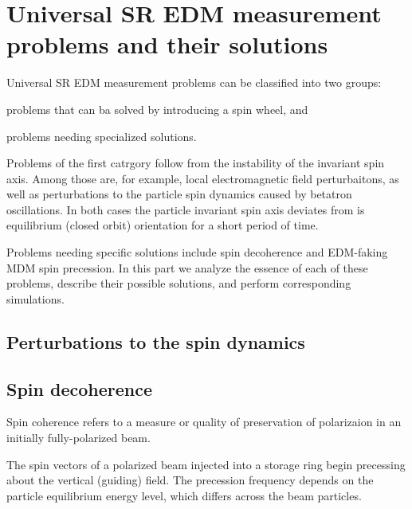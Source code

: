 

\chapter{Universal SR EDM measurement problems and their solutions} \label{chpt3:top-level}
 
Universal SR EDM measurement problems can be classified into two groups:
\begin{enumerate*}
	\item problems that can ba solved by introducing a spin wheel, and
	\item problems needing specialized solutions.
\end{enumerate*}

Problems of the first catrgory follow from the instability of the invariant spin axis. Among those are,
for example, local electromagnetic field perturbaitons, as well as perturbations to the particle
spin dynamics caused by betatron oscillations. In both cases the particle invariant spin axis deviates from
is equilibrium (closed orbit) orientation for a short period of time.

Problems needing specific solutions include spin decoherence and EDM-faking MDM spin precession. In this part we
analyze the essence of each of these problems, describe their possible solutions, and perform corresponding
simulations.
  
\section{Perturbations to the spin dynamics}\label{chpt3:smp}


\section{Spin decoherence}\label{chpt3:decoherence}
Spin coherence refers to a measure or quality of preservation of polarizaion
in an initially fully-polarized beam.~\cite[стр.~205]{Eremey:Thesis}

The spin vectors of a polarized beam injected into a storage ring
begin precessing about the vertical (guiding) field. The precession frequency
depends on the particle equilibrium energy level, which differs across the beam particles.

